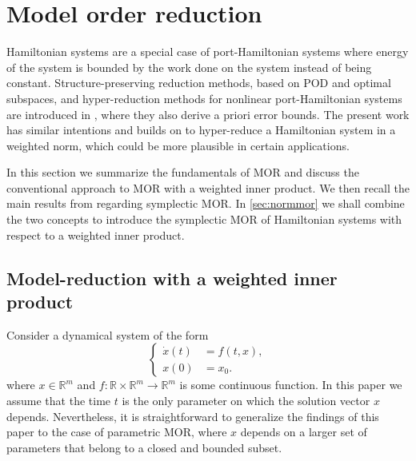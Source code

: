 \section{Model order reduction}
\label{sec:mor}
Hamiltonian systems are a special case of port-Hamiltonian systems where energy of the system is bounded by the work done on the system instead of being constant. Structure-preserving reduction methods, based on POD and optimal subspaces, and hyper-reduction methods for nonlinear port-Hamiltonian systems are introduced in \cite{chaturantabut2016structure}, where they also derive a priori error bounds. The present work has similar intentions and builds on \cite{doi:10.1137/140978922,doi:10.1137/17M1111991} to hyper-reduce a Hamiltonian system in a weighted norm, which could be more plausible in certain applications.

In this section we summarize the fundamentals of MOR and discuss the conventional approach to MOR with a weighted inner product. We then recall the main results from \cite{doi:10.1137/17M1111991} regarding symplectic MOR. In \cref{sec:normmor} we shall combine the two concepts to introduce the symplectic MOR of Hamiltonian systems with respect to a weighted inner product.

\subsection{Model-reduction with a weighted inner product} \label{sec:mor.1}
Consider a dynamical system of the form
\begin{equation} \label{eq:mor.1}
\left\{
\begin{aligned}
	\dot x(t) &= f(t,x), \\
	x(0) &= x_0.
\end{aligned}
\right.
\end{equation}
where $x\in \mathbb R^{m}$ and $f:\mathbb R \times \mathbb R^{m} \to \mathbb R^{m}$ is some continuous function. In this paper we assume that the time $t$ is the only parameter on which the solution vector $x$ depends. Nevertheless, it is straightforward to generalize the findings of this paper to the case of parametric MOR, where $x$ depends on a larger set of parameters that belong to a closed and bounded subset.

